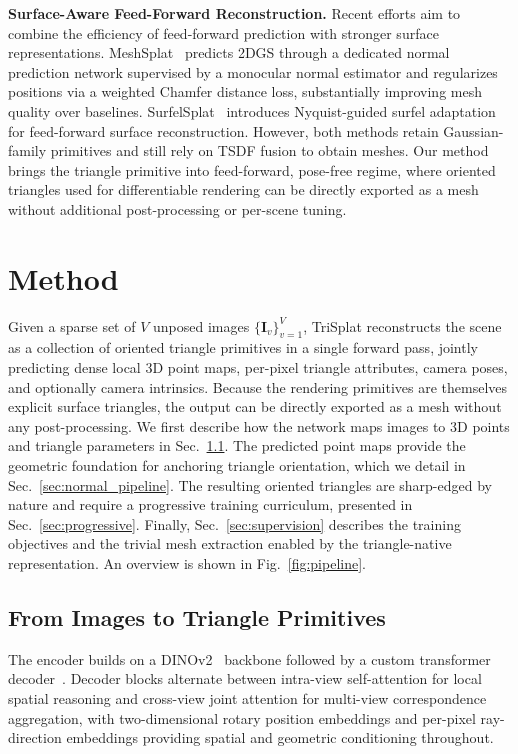 \documentclass{llmxive}
\providecommand{\method}{TriSplat\xspace}
\providecommand{\boldstart}[1]{\vspace{0.1in}\noindent\textbf{#1}}
\begin{document}
\boldstart{Surface-Aware Feed-Forward Reconstruction.}
Recent efforts aim to combine the efficiency of feed-forward prediction with stronger surface representations. MeshSplat~\citep{chang2025meshsplat} predicts 2DGS through a dedicated normal prediction network supervised by a monocular normal estimator and regularizes positions via a weighted Chamfer distance loss, substantially improving mesh quality over baselines. SurfelSplat~\citep{daisurfelsplat} introduces Nyquist-guided surfel adaptation for feed-forward surface reconstruction. However, both methods retain Gaussian-family primitives and still rely on TSDF fusion to obtain meshes. Our method brings the triangle primitive into feed-forward, pose-free regime, where oriented triangles used for differentiable rendering can be directly exported as a mesh without additional post-processing or per-scene tuning.

\section{Method}
\label{sec:method}

Given a sparse set of $V$ unposed images $\{\mathbf{I}_v\}_{v=1}^{V}$, \method reconstructs the scene as a collection of oriented triangle primitives in a single forward pass, jointly predicting dense local 3D point maps, per-pixel triangle attributes, camera poses, and optionally camera intrinsics. Because the rendering primitives are themselves explicit surface triangles, the output can be directly exported as a mesh without any post-processing. We first describe how the network maps images to 3D points and triangle parameters in Sec.~\ref{sec:prediction}. The predicted point maps provide the geometric foundation for anchoring triangle orientation, which we detail in Sec.~\ref{sec:normal_pipeline}. The resulting oriented triangles are sharp-edged by nature and require a progressive training curriculum, presented in Sec.~\ref{sec:progressive}. Finally, Sec.~\ref{sec:supervision} describes the training objectives and the trivial mesh extraction enabled by the triangle-native representation. An overview is shown in Fig.~\ref{fig:pipeline}.

\subsection{From Images to Triangle Primitives}
\label{sec:prediction}

The encoder builds on a DINOv2~\citep{oquab2023dinov2} backbone followed by a custom transformer decoder~\citep{ye2025yonosplat}. Decoder blocks alternate between intra-view self-attention for local spatial reasoning and cross-view joint attention for multi-view correspondence aggregation, with two-dimensional rotary position embeddings and per-pixel ray-direction embeddings providing spatial and geometric conditioning throughout.
\end{document}
